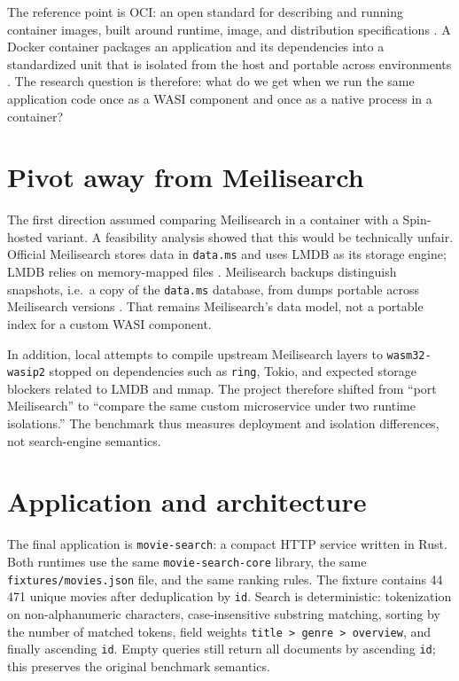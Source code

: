 \documentclass[11pt,a4paper]{article}
\begin{document}
The reference point is OCI: an open standard for describing and running container images,
built around runtime, image, and distribution specifications \cite{oci}. A Docker container
packages an application and its dependencies into a standardized unit that is isolated from
the host and portable across environments \cite{docker-container}. The research question is
therefore: what do we get when we run the same application code once as a WASI component and
once as a native process in a container?

\section{Pivot away from Meilisearch}

The first direction assumed comparing Meilisearch in a container with a Spin-hosted variant.
A feasibility analysis showed that this would be technically unfair. Official Meilisearch
stores data in \texttt{data.ms} and uses LMDB as its storage engine; LMDB relies on
memory-mapped files \cite{meilisearch-storage}. Meilisearch backups distinguish snapshots,
i.e.\ a copy of the \texttt{data.ms} database, from dumps portable across Meilisearch versions
\cite{meilisearch-backup}. That remains Meilisearch's data model, not a portable index for a
custom WASI component.

In addition, local attempts to compile upstream Meilisearch layers to \texttt{wasm32-wasip2}
stopped on dependencies such as \texttt{ring}, Tokio, and expected storage blockers related
to LMDB and mmap. The project therefore shifted from ``port Meilisearch'' to ``compare the
same custom microservice under two runtime isolations.'' The benchmark thus measures
deployment and isolation differences, not search-engine semantics.

\section{Application and architecture}

The final application is \texttt{movie-search}: a compact HTTP service written in Rust. Both
runtimes use the same \texttt{movie-search-core} library, the same \texttt{fixtures/movies.json}
file, and the same ranking rules. The fixture contains 44\,471 unique movies after deduplication
by \texttt{id}. Search is deterministic: tokenization on non-alphanumeric characters,
case-insensitive substring matching, sorting by the number of matched tokens, field weights
\texttt{title > genre > overview}, and finally ascending \texttt{id}. Empty queries still return
all documents by ascending \texttt{id}; this preserves the original benchmark semantics.
\end{document}
